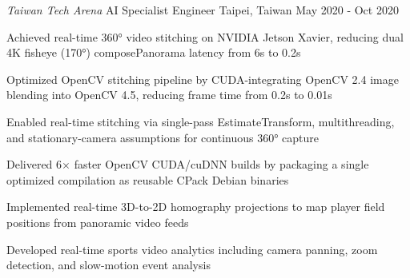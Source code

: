 \begin{cventries}
 \cventry
    {\emph{Taiwan Tech Arena}} %
    {AI Specialist Engineer} %
    {Taipei, Taiwan} %
    {May 2020 - Oct 2020} %
    {
        \begin{cvitems} %
        \item {Achieved real-time 360° video stitching on NVIDIA Jetson Xavier, reducing dual 4K fisheye (170°) composePanorama latency from 6s to 0.2s}
        \item {Optimized OpenCV stitching pipeline by CUDA-integrating OpenCV 2.4 image blending into OpenCV 4.5, reducing frame time from 0.2s to 0.01s}
        \item {Enabled real-time stitching via single-pass EstimateTransform, multithreading, and stationary-camera assumptions for continuous 360° capture}
        \item {Delivered 6$\times$ faster OpenCV CUDA/cuDNN builds by packaging a single optimized compilation as reusable CPack Debian binaries}
        \item {Implemented real-time 3D-to-2D homography projections to map player field positions from panoramic video feeds}
        \item {Developed real-time sports video analytics including camera panning, zoom detection, and slow-motion event analysis}
        \end{cvitems}
}
\end{cventries}
